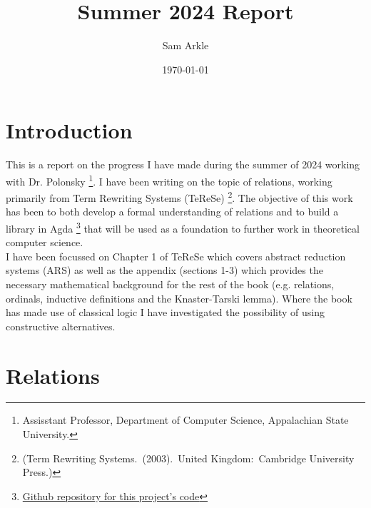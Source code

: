 \documentclass{scrartcl}
\title{Summer 2024 Report}
\author{Sam Arkle}
\date{\today}
\begin{document}
\maketitle

\section{Introduction}
This is a report on the progress I have made during the summer of 2024 working with Dr. Polonsky \footnote{Assisstant Professor, Department of Computer Science, Appalachian State University.}. I have been writing on the topic of relations, working primarily from Term Rewriting Systems (TeReSe) \footnote{(Term Rewriting Systems. (2003). United Kingdom: Cambridge University Press.)}.
The objective of this work has been to both develop a formal understanding of relations and to build a library in Agda \footnote{\href{https://github.com/DrPolonsky/LAM/tree/main/Relations}{Github repository for this project's code}} that will be used as a foundation to further work in theoretical computer science.
\\
I have been focussed on Chapter 1 of TeReSe which covers abstract reduction systems (ARS) as well as the appendix (sections 1-3) which provides the necessary mathematical background for the rest of the book (e.g. relations, ordinals, inductive definitions and the Knaster-Tarski lemma). Where the book has made use of classical logic I have investigated the possibility of using constructive alternatives.

\section{Relations}
\end{document}
